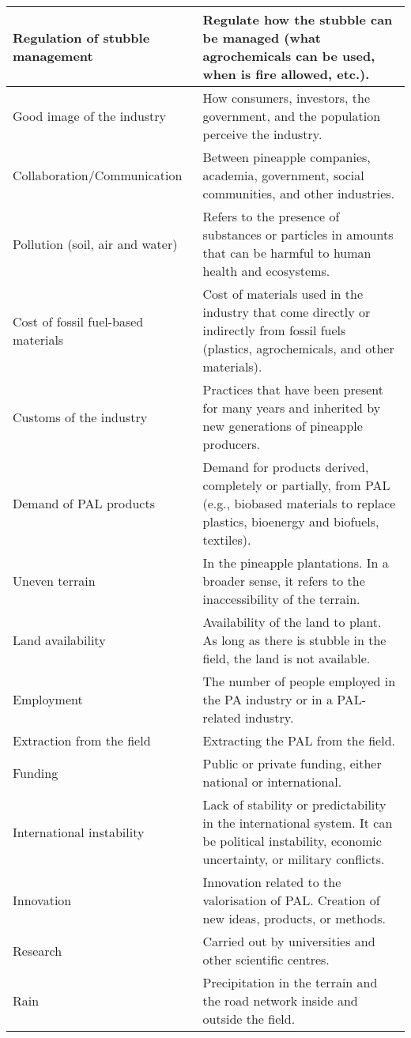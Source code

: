 \begin{xltabular}{\textwidth}{XX}
Regulation of stubble management &
  Regulate how the stubble can be managed (what agrochemicals can be used,  when is fire allowed, etc.). \\ \hline
Good image of the industry &
  How consumers, investors, the government, and the population perceive the industry. \\ \hline
Collaboration/Communication &
  Between pineapple companies, academia, government, social communities, and other industries. \\ \hline
Pollution (soil, air and water) &
  Refers to the presence of substances or particles in amounts that can be harmful to human health and ecosystems. \\ \hline
Cost of fossil fuel-based materials &
  Cost of materials used in the industry that come directly or indirectly from fossil fuels (plastics, agrochemicals, and other materials). \\ \hline
Customs of the industry &
  Practices that have been present for many years and inherited by new generations of pineapple producers. \\ \hline
Demand of PAL products &
  Demand for products derived, completely or partially, from PAL (e.g., biobased materials to replace plastics, bioenergy and biofuels, textiles). \\ \hline
Uneven terrain &
  In the pineapple plantations. In a broader sense, it refers to the inaccessibility of the terrain. \\ \hline
Land availability &
  Availability of the land to plant. As long as there is stubble in the field, the land is not available. \\ \hline
Employment &
  The number of people employed in the PA industry or in a PAL-related industry. \\ \hline
Extraction from the field &
  Extracting the PAL from the field. \\ \hline
Funding &
  Public or private funding, either national or international. \\ \hline
International instability &
  Lack of stability or predictability in the international system. It can be political instability, economic uncertainty, or military conflicts. \\ \hline
Innovation &
  Innovation related to the valorisation of PAL. Creation of new ideas, products, or methods. \\ \hline
Research &
  Carried out by universities and other scientific centres. \\ \hline
Rain &
  Precipitation in the terrain and the road network inside and outside the field. \\ \hline

\end{xltabular}
